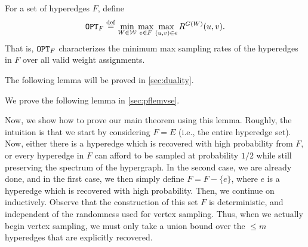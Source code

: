 \documentclass{article}
\begin{document}
\begin{definition}
    For a set of hyperedges $F$, define
    \begin{align*}
        \mathtt{OPT}_F \stackrel{\mathrm{def}}{=}
        \min_{W\in \mathcal{W}} \max_{e\in F}
        \max_{(u,v)\in e} R^{G(W)}(u,v).
    \end{align*}
    That is, $\mathtt{OPT}_F$ characterizes
    the minimum max sampling rates of the hyperedges in $F$
    over all valid weight assignments.
\end{definition}


The following lemma will be proved in \cref{sec:duality}.



\lemmedium*


We prove the following lemma in \cref{sec:pflemvse}.


\lemvse*

Now, we show how to prove our main theorem using this lemma. Roughly, the intuition is that we start by considering $F = E$ (i.e., the entire hyperedge set). Now, either there is a hyperedge which is recovered with high probability from $F$, or every hyperedge in $F$ can afford to be sampled at probability $1/2$ while still preserving the spectrum of the hypergraph. In the second case, we are already done, and in the first case, we then simply define $F = F - \{e\}$, where $e$ is a hyperedge which is recovered with high probability. Then, we continue on inductively. Observe that the construction of this set $F$ is deterministic, and independent of the randomness used for vertex sampling. Thus, when we actually begin vertex sampling, we must only take a union bound over the $\leq m$ hyperedges that are explicitly recovered.
\end{document}
